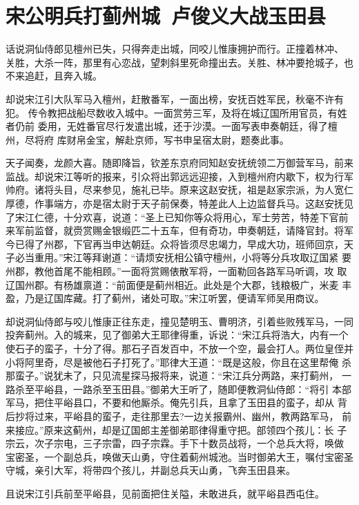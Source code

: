 \chapter{宋公明兵打蓟州城~卢俊义大战玉田县}

话说洞仙侍郎见檀州已失，只得奔走出城，同咬儿惟康拥护而行。正撞着林冲、
关胜，大杀一阵，那里有心恋战，望刺斜里死命撞出去。关胜、林冲要抢城子，也
不来追赶，且奔入城。

却说宋江引大队军马入檀州，赶散番军，一面出榜，安抚百姓军民，秋毫不许有犯。
传令教把战船尽数收入城中。一面赏劳三军，及将在城辽国所用官员，有姓者仍前
委用，无姓番官尽行发遣出城，还于沙漠。一面写表申奏朝廷，得了檀州，尽将府
库财帛金宝，解赴京师，写书申呈宿太尉，题奏此事。

天子闻奏，龙颜大喜。随即降旨，钦差东京府同知赵安抚统领二万御营军马，前来
监战。却说宋江等听的报来，引众将出郭远远迎接，入到檀州府内歇下，权为行军
帅府。诸将头目，尽来参见，施礼已毕。原来这赵安抚，祖是赵家宗派，为人宽仁
厚德，作事端方，亦是宿太尉于天子前保奏，特差此人上边监督兵马。这赵安抚见
了宋江仁德，十分欢喜，说道：“圣上已知你等众将用心，军士劳苦，特差下官前
来军前监督，就赍赏赐金银缎匹二十五车，但有奇功，申奏朝廷，请降官封。将军
今已得了州郡，下官再当申达朝廷。众将皆须尽忠竭力，早成大功，班师回京，天
子必当重用。”宋江等拜谢道：“请烦安抚相公镇守檀州，小将等分兵攻取辽国紧
要州郡，教他首尾不能相顾。”一面将赏赐俵散军将，一面勒回各路军马听调，攻
取辽国州郡。有杨雄禀道：“前面便是蓟州相近。此处是个大郡，钱粮极广，米麦
丰盈，乃是辽国库藏。打了蓟州，诸处可取。”宋江听罢，便请军师吴用商议。

却说洞仙侍郎与咬儿惟康正往东走，撞见楚明玉、曹明济，引着些败残军马，一同
投奔蓟州。入的城来，见了御弟大王耶律得重，诉说：“宋江兵将浩大，内有一个
使石子的蛮子，十分了得。那石子百发百中，不放一个空，最会打人。两位皇侄并
小将阿里奇，尽是被他石子打死了。”耶律大王道：“既是这般，你且在这里帮俺
杀那蛮子。”说犹未了，只见流星探马报将来，说道：“宋江兵分两路，来打蓟州，
一路杀至平峪县，一路杀至玉田县。”御弟大王听了，随即便教洞仙侍郎：“将引
本部军马，把住平峪县口，不要和他厮杀。俺先引兵，且拿了玉田县的蛮子，却从
背后抄将过来，平峪县的蛮子，走往那里去?一边关报霸州、幽州，教两路军马，
前来接应。”原来这蓟州，却是辽国郎主差御弟耶律得重守把。部领四个孩儿：长
子宗云，次子宗电，三子宗雷，四子宗霖。手下十数员战将，一个总兵大将，唤做
宝密圣，一个副总兵，唤做天山勇，守住着蓟州城池。当时御弟大王，嘱付宝密圣
守城，亲引大军，将带四个孩儿，并副总兵天山勇，飞奔玉田县来。

且说宋江引兵前至平峪县，见前面把住关隘，未敢进兵，就平峪县西屯住。

